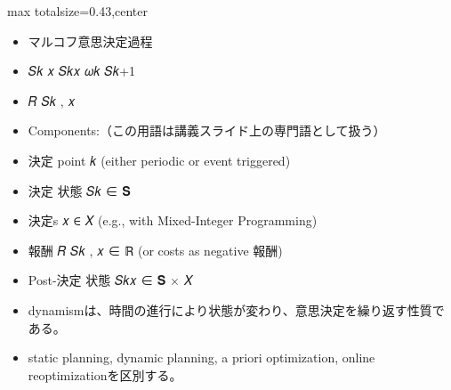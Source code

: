 \clearpage
{}
\begin{minipage}[t]{0.405\textwidth}
\begin{adjustbox}{max totalsize={\textwidth}{0.43\textheight},center}
\begin{minipage}{\textwidth}\scriptsize
{}\begin{itemize}
\item マルコフ意思決定過程
\item 𝑆𝑘 𝑥 𝑆𝑘𝑥 𝜔𝑘 𝑆𝑘+1
\item 𝑅 𝑆𝑘 , 𝑥
\item Components:（この用語は講義スライド上の専門語として扱う）
\item 決定 point 𝑘 (either periodic or event triggered)
\item 決定 状態 𝑆𝑘 ∈ 𝐒
\item 決定s 𝑥 ∈ 𝑋 (e.g., with Mixed-Integer Programming)
\item 報酬 𝑅 𝑆𝑘 , 𝑥 ∈ ℝ (or costs as negative 報酬)
\item Post-決定 状態 𝑆𝑘𝑥 ∈ 𝐒 × 𝑋
\end{itemize}\begin{itemize}
\item dynamismは、時間の進行により状態が変わり、意思決定を繰り返す性質である。
\item static planning, dynamic planning, a priori optimization, online reoptimizationを区別する。
\end{itemize}
\end{minipage}
\end{adjustbox}
\end{minipage}\hfill
